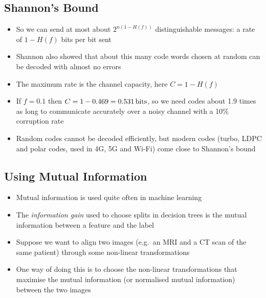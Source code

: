 
\begin{slide}
\section[-1]{Shannon's Bound}
  
\begin{PauseHighLight}
  \begin{itemize}
  \item So we can send at most about $2^{n(1-H(f))}$ distinguishable
    messages: a rate of $1-H(f)$ bits per bit sent\pause
  \item Shannon also showed that about this many code words chosen at
    random can be decoded with almost no errors\pause
  \item The maximum rate is the channel capacity, here $C = 1-H(f)$\pause
  \item If $f=0.1$ then $C=1-0.469 = 0.531 \,\mathrm{bits}$, so we need codes
    about 1.9 times as long to communicate accurately over a noisy
    channel with a 10\% corruption rate\pause
  \item Random codes cannot be decoded efficiently, but modern codes
    (turbo, LDPC and polar codes, used in 4G, 5G and Wi-Fi) come close
    to Shannon's bound\pause
  \end{itemize}
\end{PauseHighLight}

\end{slide}


\begin{slide}
\section{Using Mutual Information}

\begin{PauseHighLight}
  \begin{itemize}
  \item Mutual information is used quite often in machine
    learning\pause
  \item The \emph{information gain} used to choose splits in decision
    trees is the mutual information between a feature and the
    label\pause
  \item Suppose we want to align two images (e.g.\ an MRI and a CT scan
    of the same patient) through some non-linear
    transformations\pause
  \item One way of doing this is to choose the non-linear
    transformations that maximise the mutual information (or
    normalised mutual information) between the two images\pause
  \end{itemize}
\end{PauseHighLight}

\end{slide}



